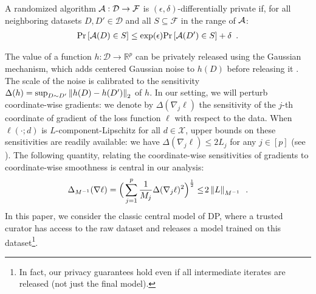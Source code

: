 \begin{definition}
  A randomized algorithm
  $\mathcal A : \mathcal D
    \rightarrow \mathcal F$ is $(\epsilon, \delta)$-differentially private if,
  for all neighboring datasets $D, D' \in \mathcal D$ and all
  $S \subseteq \mathcal F$ in the range of $\mathcal A$:
  \begin{align*}
    \textnormal{Pr} \left[ \mathcal A(D) \in S \right] \le \exp(\epsilon) \textnormal{Pr} \left[ \mathcal A(D') \in S \right] + \delta \enspace.
  \end{align*}
\end{definition}
The value of a function $h: \mathcal D \rightarrow \mathbb R^p$ can be privately
released using the Gaussian mechanism, which adds centered Gaussian noise
to $h(D)$ before releasing it \citep{dwork2013Algorithmic}.
The scale of the noise is calibrated to the sensitivity $
  \Delta(h)
  = \sup_{D \sim D'} \left \lVert h(D) - h(D') \right \rVert_2$ of $h$.
In our setting, we will perturb coordinate-wise gradients: we denote by
$\Delta(\nabla_j \ell)$ the sensitivity of the $j$\nobreakdash-th coordinate
of gradient of the loss function $\ell$ with respect to the data.
When $\ell(\cdot;d)$ is $L$-component-Lipschitz for all $d\in\mathcal{X}$, upper
bounds on these sensitivities are readily available: we have
$\Delta(\nabla_j\ell) \le 2L_j$ for any $j\in[p]$ (see ).
The following quantity, relating the coordinate-wise sensitivities of gradients
to coordinate-wise smoothness is central in our analysis:
\begin{align}
  \label{eq:delta-lipschitz-norm}
  \Delta_{M^{-1}}(\nabla \ell)
  = \Big(\sum_{j=1}^p \frac{1}{M_j} \Delta (\nabla_j\ell)^2\Big)^{\frac{1}{2}}
  \leq \! 2 \left \lVert L \right \rVert_{M^{-1}}\enspace.
\end{align}
In this paper, we consider the classic central model of DP, where a trusted
curator has access to the raw dataset and releases a model trained on this
dataset\footnote{In fact, our privacy guarantees hold even if all
  intermediate iterates are released (not just the final model).}.

